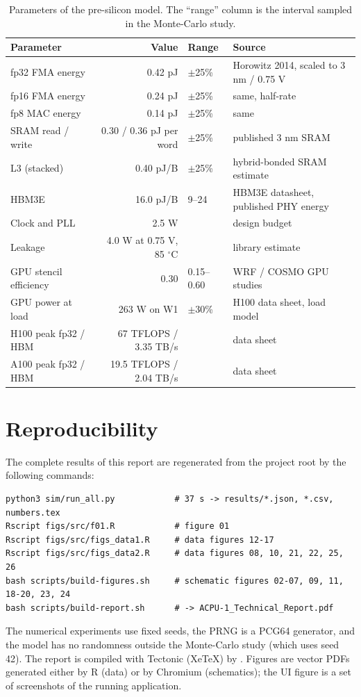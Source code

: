 \begin{table}[h]
\centering\small
\caption{Parameters of the pre-silicon model. The ``range'' column is the interval sampled in the
Monte-Carlo study.}
\begin{tabular}{@{}lrll@{}}
\toprule
Parameter & Value & Range & Source\\
\midrule
fp32 FMA energy & 0.42 pJ & $\pm$25\% & Horowitz 2014, scaled to 3 nm / 0.75 V\\
fp16 FMA energy & 0.24 pJ & $\pm$25\% & same, half-rate\\
fp8 MAC energy & 0.14 pJ & $\pm$25\% & same\\
SRAM read / write & 0.30 / 0.36 pJ per word & $\pm$25\% & published 3 nm SRAM\\
L3 (stacked) & 0.40 pJ/B & $\pm$25\% & hybrid-bonded SRAM estimate\\
HBM3E & 16.0 pJ/B & 9--24 & HBM3E datasheet, published PHY energy\\
Clock and PLL & 2.5 W & & design budget\\
Leakage & 4.0 W at 0.75 V, 85 $^\circ$C & & library estimate\\
GPU stencil efficiency & 0.30 & 0.15--0.60 & WRF / COSMO GPU studies\\
GPU power at load & 263 W on W1 & $\pm$30\% & H100 data sheet, load model\\
H100 peak fp32 / HBM & 67 TFLOPS / 3.35 TB/s & & data sheet\\
A100 peak fp32 / HBM & 19.5 TFLOPS / 2.04 TB/s & & data sheet\\
\bottomrule
\end{tabular}
\end{table}

\section{Reproducibility}\label{app:repro}

The complete results of this report are regenerated from the project root by the
following commands:
\begin{verbatim}
python3 sim/run_all.py            # 37 s -> results/*.json, *.csv, numbers.tex
Rscript figs/src/f01.R            # figure 01
Rscript figs/src/figs_data1.R     # data figures 12-17
Rscript figs/src/figs_data2.R     # data figures 08, 10, 21, 22, 25, 26
bash scripts/build-figures.sh     # schematic figures 02-07, 09, 11, 18-20, 23, 24
bash scripts/build-report.sh      # -> ACPU-1_Technical_Report.pdf
\end{verbatim}
The numerical experiments use fixed seeds, the PRNG is a PCG64 generator, and the model has no
randomness outside the Monte-Carlo study (which uses seed 42). The report is compiled with Tectonic (XeTeX) by . Figures are vector PDFs generated either by R (data) or by
Chromium (schematics); the UI figure is a set of screenshots of the running application.

